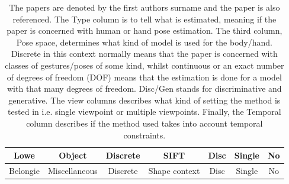 \documentclass[a4paper,11pt]{kth-mag}
\begin{document}
\begin{table}[!ht]
{\begin{tabular}{|c|c|c|c|c|c|c|}
        \\
        \hline
        Lowe \cite{SIFT}            & Object 
                                    & Discrete 
                                    & SIFT
                                    & Disc%
                                    & Single
                                    & No
        \\
        \hline
        Belongie \cite{shape}     
                                    & Miscellaneous 
                                    & Discrete %
                                    & Shape context %
                                    & Disc %
                                    & Single
                                    & No
        \\
        \hline
    \end{tabular}}
    \caption{
The papers are denoted by the first authors surname and the paper is also referenced.
The Type column is to tell what is estimated, meaning if the paper is concerned with human or hand pose estimation.
The third column, Pose space, determines what kind of model is used for the body/hand.
Discrete in this context normally means that the paper is concerned with classes of gestures/poses of some kind, whilst continuous or an exact number of degrees of freedom (DOF) means that the estimation is done for a model with that many degrees of freedom.
Disc/Gen stands for discriminative and generative.
The view columns describes what kind of setting the method is tested in i.e. single viewpoint or multiple viewpoints.
Finally, the Temporal column describes if the method used takes into account temporal constraints.
}
    \label{tab:overview}
\end{table}
\end{document}
